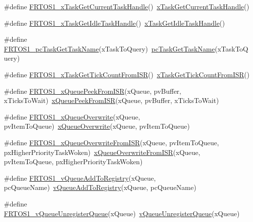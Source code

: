 \begin{DoxyCompactItemize}
\item 
\#define \hyperlink{group___f_r_t_o_s1__module_ga0d404ee76d0ebf0a8c05cc93758c9482}{F\+R\+T\+O\+S1\+\_\+x\+Task\+Get\+Current\+Task\+Handle}()~\hyperlink{tasks_8c_a28aaeed93d0de14da726f3a1a8c33251}{x\+Task\+Get\+Current\+Task\+Handle}()
\item 
\#define \hyperlink{group___f_r_t_o_s1__module_ga719ba1f67fd6fe47bdb913b189d11613}{F\+R\+T\+O\+S1\+\_\+x\+Task\+Get\+Idle\+Task\+Handle}()~\hyperlink{tasks_8c_a38e3c3df6fc5b28c14459e32474917fb}{x\+Task\+Get\+Idle\+Task\+Handle}()
\item 
\#define \hyperlink{group___f_r_t_o_s1__module_ga5287b9ac0fb65f22ea43233129941081}{F\+R\+T\+O\+S1\+\_\+pc\+Task\+Get\+Task\+Name}(x\+Task\+To\+Query)~\hyperlink{_free_r_t_o_s_8h_a626c65afa49005d067495a6cdaace885}{pc\+Task\+Get\+Task\+Name}(x\+Task\+To\+Query)
\item 
\#define \hyperlink{group___f_r_t_o_s1__module_ga94767df0ea5aaacb1f77ec1ab6d70b89}{F\+R\+T\+O\+S1\+\_\+x\+Task\+Get\+Tick\+Count\+From\+I\+SR}()~\hyperlink{tasks_8c_ad58fd766b8f438b5703276f585738762}{x\+Task\+Get\+Tick\+Count\+From\+I\+SR}()
\item 
\#define \hyperlink{group___f_r_t_o_s1__module_ga25b51ac12e32ed1b5da8495eb752ac27}{F\+R\+T\+O\+S1\+\_\+x\+Queue\+Peek\+From\+I\+SR}(x\+Queue,  pv\+Buffer,  x\+Ticks\+To\+Wait)~\hyperlink{queue_8h_ac402adf98be1fb8ca0345f30dc11a9dc}{x\+Queue\+Peek\+From\+I\+SR}(x\+Queue, pv\+Buffer, x\+Ticks\+To\+Wait)
\item 
\#define \hyperlink{group___f_r_t_o_s1__module_ga88c586d43b510fdf5a316b0ee1e028f7}{F\+R\+T\+O\+S1\+\_\+x\+Queue\+Overwrite}(x\+Queue,  pv\+Item\+To\+Queue)~\hyperlink{queue_8h_a8e9ced123b5a0e37a36d3bbdb2e56b4e}{x\+Queue\+Overwrite}(x\+Queue, pv\+Item\+To\+Queue)
\item 
\#define \hyperlink{group___f_r_t_o_s1__module_ga20061a4cc11e7fffd173618f77452ce0}{F\+R\+T\+O\+S1\+\_\+x\+Queue\+Overwrite\+From\+I\+SR}(x\+Queue,  pv\+Item\+To\+Queue,  px\+Higher\+Priority\+Task\+Woken)~\hyperlink{queue_8h_abdcd6a86ef82034d002193e79cfd3ce8}{x\+Queue\+Overwrite\+From\+I\+SR}(x\+Queue, pv\+Item\+To\+Queue, px\+Higher\+Priority\+Task\+Woken)
\item 
\#define \hyperlink{group___f_r_t_o_s1__module_gabe4547ea6de76b95d8851f20d18d0b8a}{F\+R\+T\+O\+S1\+\_\+v\+Queue\+Add\+To\+Registry}(x\+Queue,  pc\+Queue\+Name)~\hyperlink{queue_8c_a1d5e2402c801e7a0ab079f6944b97f93}{v\+Queue\+Add\+To\+Registry}(x\+Queue, pc\+Queue\+Name)
\item 
\#define \hyperlink{group___f_r_t_o_s1__module_ga84040ca0e6ace32d61c5cc5a54acc205}{F\+R\+T\+O\+S1\+\_\+v\+Queue\+Unregister\+Queue}(x\+Queue)~\hyperlink{queue_8c_ac695c7cde3c32b32a1db4689239603ed}{v\+Queue\+Unregister\+Queue}(x\+Queue)

\end{DoxyCompactItemize}

